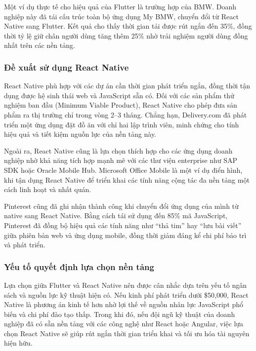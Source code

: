 \indent Một ví dụ thực tế cho hiệu quả của Flutter là trường hợp của BMW. Doanh nghiệp này đã tái cấu trúc toàn bộ ứng dụng My BMW, chuyển đổi từ React Native sang Flutter. Kết quả cho thấy thời gian tải được rút ngắn đến 35\%, đồng thời tỷ lệ giữ chân người dùng tăng thêm 25\% nhờ trải nghiệm người dùng đồng nhất trên các nền tảng.

\subsubsection{Đề xuất sử dụng React Native}

\indent React Native phù hợp với các dự án cần thời gian phát triển ngắn, đồng thời tận dụng được hệ sinh thái web và JavaScript sẵn có. Đối với các sản phẩm thử nghiệm ban đầu (Minimum Viable Product), React Native cho phép đưa sản phẩm ra thị trường chỉ trong vòng 2–3 tháng. Chẳng hạn, Delivery.com đã phát triển một ứng dụng đặt đồ ăn với chỉ hai lập trình viên, minh chứng cho tính hiệu quả và tiết kiệm nguồn lực của nền tảng này.

\indent Ngoài ra, React Native cũng là lựa chọn thích hợp cho các ứng dụng doanh nghiệp nhờ khả năng tích hợp mạnh mẽ với các thư viện enterprise như SAP SDK hoặc Oracle Mobile Hub. Microsoft Office Mobile là một ví dụ điển hình, khi tận dụng React Native để triển khai các tính năng cộng tác đa nền tảng một cách linh hoạt và nhất quán.

\indent Pinterest cũng đã ghi nhận thành công khi chuyển đổi ứng dụng của mình từ native sang React Native. Bằng cách tái sử dụng đến 85\% mã JavaScript, Pinterest đã đồng bộ hiệu quả các tính năng như “thả tim” hay “lưu bài viết” giữa phiên bản web và ứng dụng mobile, đồng thời giảm đáng kể chi phí bảo trì và phát triển.

\subsubsection{Yếu tố quyết định lựa chọn nền tảng}

\indent Lựa chọn giữa Flutter và React Native nên được cân nhắc dựa trên yếu tố ngân sách và nguồn lực kỹ thuật hiện có. Nếu kinh phí phát triển dưới \$50,000, React Native là phương án kinh tế hơn nhờ lợi thế về nguồn nhân lực JavaScript phổ biến và chi phí đào tạo thấp. Trong khi đó, nếu đội ngũ kỹ thuật của doanh nghiệp đã có sẵn nền tảng với các công nghệ như React hoặc Angular, việc lựa chọn React Native sẽ giúp rút ngắn thời gian triển khai và tối ưu hóa tài nguyên hiện hữu.


